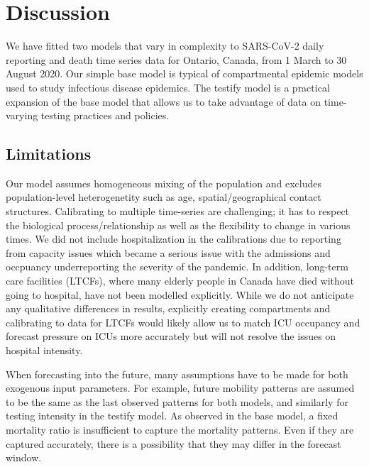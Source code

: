 \documentclass[12pt]{article}\usepackage[]{graphicx}\usepackage[]{color}
\begin{document}
\FloatBarrier

\section{Discussion}

We have fitted two models that vary in complexity to SARS-CoV-2 daily reporting and death time series data for Ontario, Canada, from 1 March to 30 August 2020.  Our simple base model is typical of compartmental epidemic models used to study infectious disease epidemics.  The testify model is a practical expansion of the base model that allows us to take advantage of data on time-varying testing practices and policies.


\subsection{Limitations}

Our model assumes homogeneous mixing of the population and excludes population-level heterogenetity such as age, spatial/geographical contact structures.
Calibrating to multiple time-series are challenging; it has to respect the biological process/relationship as well as the flexibility to change in various times. 
We did not include hospitalization in the calibrations due to reporting from capacity issues which became a serious issue with the admissions and occpuancy underreporting the severity of the pandemic.
In addition, long-term care facilities (LTCFs), where many elderly people in Canada have died without going to hospital, have not been modelled explicitly.  
While we do not anticipate any qualitative differences in results, explicitly creating compartments and calibrating to data for LTCFs would likely allow us to match ICU occupancy and forecast
pressure on ICUs more accurately but will not resolve the issues on hospital intensity.

When forecasting into the future, many assumptions have to be made for both exogenous input parameters. For example, future mobility patterns are assumed to be the same as the last observed patterns for both models, and similarly for testing intensity in the testify model. As observed in the base model, a fixed mortality ratio is insufficient to capture the mortality patterns. Even if they are captured accurately, there is a possibility that they may differ in the forecast window.
 
\end{document}
